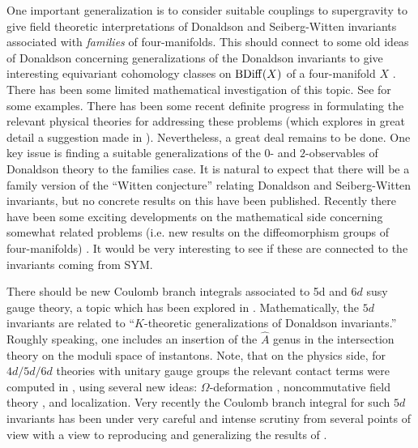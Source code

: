 \documentclass[12pt]{article}
\begin{document}
One  important generalization is to consider suitable couplings to supergravity
to give field theoretic interpretations of Donaldson and Seiberg-Witten invariants associated
with \emph{families} of four-manifolds. This should connect to some old ideas of Donaldson concerning
generalizations of the Donaldson invariants to give interesting equivariant cohomology classes on
${\rm BDiff}(X)$ of a four-manifold $X$ \cite{DonaldsonYangMillsInvariants,DonaldsonReview}. 
There has been  some limited mathematical 
investigation of this topic. See \cite{LiuLi,NakamuraFamilies1,NakamuraFamilies2,RubermanPolynomial,BaragliaFamilies1,BaragliaFamilies2,BaragliaFamilies3,KonnoCharacteristic} for some examples. 
There has been some 
recent definite progress in formulating the relevant physical theories 
for addressing these problems \cite{CushingEtAl} (which explores in great detail a suggestion made in \cite{Moore:1997pc}). 
Nevertheless,  a great deal remains to be done. One key issue is 
finding a suitable generalizations of the $0$- and $2$-observables 
of Donaldson theory to the families case. It is natural to expect that there will be a family version of the ``Witten conjecture'' relating Donaldson and Seiberg-Witten invariants, but no concrete results on this have been published. Recently there have been some exciting developments on the mathematical side concerning somewhat related problems (i.e. new results on the diffeomorphism groups of four-manifolds) 
\cite{Watanabe-1,Watanabe-2,Watanabe-3,Watanabe-4}. It would be very interesting to see if these are connected to the invariants coming from SYM. 


There should be new Coulomb branch integrals associated to 5d and $6d$  susy gauge
theory, a topic which has been explored in
\cite{Nekrasov:1996cz,Losev:1998,Closset:2021lhd,GottscheNakajimaYoshioka,Gottsche:2021ihz,Closset:2022vjj,KimManschotEtAl}. Mathematically,
the $5d$ invariants are related to ``$K$-theoretic generalizations of Donaldson invariants.'' 
Roughly speaking, one includes an insertion of the $\hat A$ genus in the intersection 
theory on the moduli space of instantons. 
Note, that on the physics side, for $4d/5d/6d$ theories with unitary gauge groups the
relevant contact terms were computed in \cite{Nekrasov:2002qd, losev2003small, nekrasov2003seibergwitten,Marshakov:2006ii,Nekrasov:2012xe,Kimura:2015rgi}, using several new ideas: $\Omega$-deformation \cite{Nekrasov:2002qd}, noncommutative field theory
\cite{NekrasovS:1998}, and localization. Very recently the Coulomb branch integral 
for such $5d$ invariants has been under very careful and intense scrutiny from 
several points of view \cite{Closset:2022vjj,KimManschotEtAl} with a view to reproducing 
and generalizing the results of \cite{GottscheNakajimaYoshioka}. 
\end{document}
